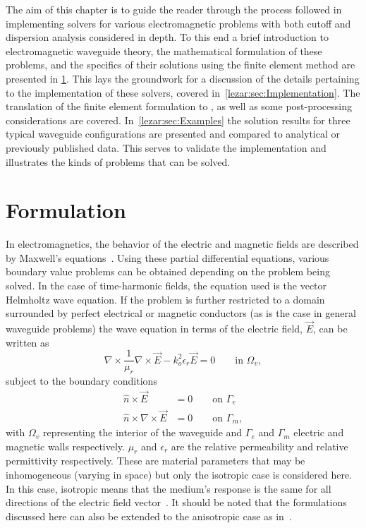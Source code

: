 The aim of this chapter is to guide the reader through the process
followed in implementing solvers for various electromagnetic problems
with both cutoff and dispersion analysis considered in depth. To
this end a brief introduction to electromagnetic waveguide theory,
the mathematical formulation of these problems, and the specifics
of their solutions using the finite element method are presented in
\ref{lezar:sec:formulation}. This lays the groundwork for a discussion of
the details pertaining to the \fenics{} implementation of these solvers,
covered in~\ref{lezar:sec:Implementation}. The translation of the finite
element formulation to \fenics{}, as well as some post-processing
considerations are covered. In~\ref{lezar:sec:Examples} the solution
results for three typical waveguide configurations are presented and
compared to analytical or previously published data. This serves to
validate the implementation and illustrates the kinds of problems that
can be solved.

\section{Formulation}
\label{lezar:sec:formulation}

In electromagnetics, the behavior of the electric and magnetic fields
are described by Maxwell's equations~\citep{Jin2002, Smith1997}.
Using these partial differential equations, various boundary value
problems can be obtained depending on the problem being solved.
In the case of time-harmonic fields, the equation used is the vector
Helmholtz wave equation. If the problem
is further restricted to a domain surrounded by perfect electrical or
magnetic conductors (as is the case in general waveguide problems)
the wave equation in terms of the electric field, $\vec{E}$, can be
written as~\citep{Jin2002}
\begin{equation}
    \label{eq:lezar:vector_helmholtz}
    \nabla\times\frac{1}{\mu_r}\nabla\times\vec{E} - k_o^2\epsilon_r\vec{E} = 0\qquad \text{in
    $\Omega_v$},
\end{equation}
subject to the boundary conditions
\begin{align}
    \label{eq:lezar:electric_wall_BC}
    \hat{n}\times\vec{E} &= 0\qquad \text{on $\Gamma_{e}$}\\
    \label{eq:lezar:magnetic_wall_BC}
    \hat{n}\times\nabla\times{\vec{E}}{} &= 0\qquad \text{on $\Gamma_{m}$},
\end{align}
with $\Omega_v$ representing the interior of the waveguide and
$\Gamma_{e}$ and $\Gamma_{m}$ electric and magnetic walls
respectively. $\mu_r$ and $\epsilon_r$ are the relative permeability
and relative permittivity respectively.  These are material parameters
that may be inhomogeneous (varying in space) but only the isotropic
case is considered here. In this case, isotropic means that the
medium's response is the same for all directions of the electric field
vector~\citep{RamoWhinneryVanDuzer1994}. It should be noted that the
formulations discussed here can also be extended to the anisotropic
case as in~\citet{PolycarpouLyonsBalanis1996}.

